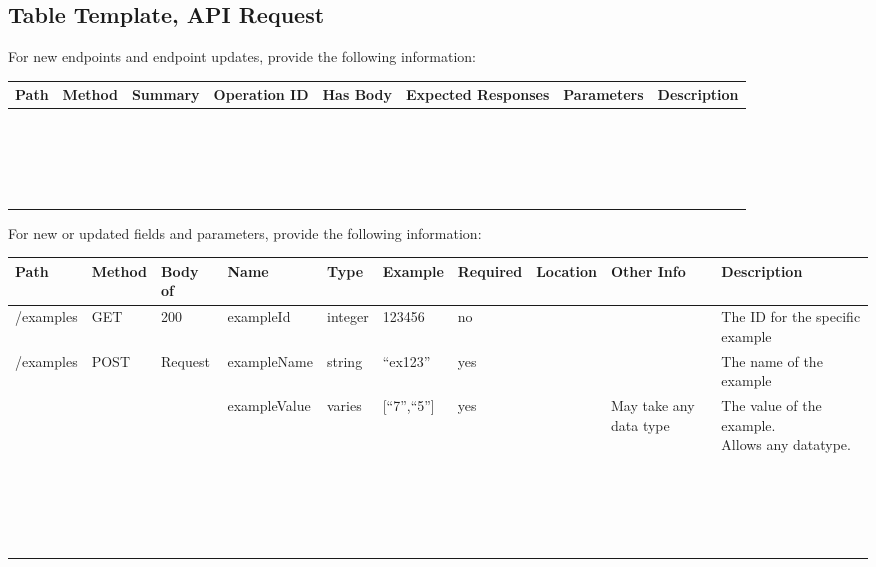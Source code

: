 \documentclass[a4paper]{article}
\begin{document}
\clearpage
\begin{landscape}
\subsection*{Table Template, API Request}
For new endpoints and endpoint updates, provide the following information:
\begin{flushleft}
\begin{tabular}{|l|l|l|l|l|l|l|l|}
	\hline
	\textbf{Path} & \textbf{Method} & \textbf{Summary} & \textbf{Operation ID} & \textbf{Has Body} & \textbf{Expected Responses} & \textbf{Parameters} & \textbf{Description}\\\hline
	~ & ~ & ~ & ~ & ~ & ~ & ~ & ~ \\\hline
	~ & ~ & ~ & ~ & ~ & ~ & ~ & ~ \\\hline
	~ & ~ & ~ & ~ & ~ & ~ & ~ & ~ \\\hline
	~ & ~ & ~ & ~ & ~ & ~ & ~ & ~ \\\hline
\end{tabular}
\end{flushleft}

For new or updated fields and parameters, provide the following information:

\begin{flushleft}
\begin{tabular}{|l|l|l|l|l|l|l|l|l|l|}
	\hline
	\textbf{Path} & \textbf{Method} & \textbf{Body of} & \textbf{Name} & \textbf{Type} & \textbf{Example} & \textbf{Required} & \textbf{Location} & \textbf{Other Info} & \textbf{Description}\\\hline
	/examples & GET & 200 & exampleId & integer & 123456 & no & ~ & ~ & The ID for the specific example\\\hline
	/examples & POST & Request & exampleName & string & {}``ex123'' & yes & ~ & ~ & The name of the example\\\hline
	~ & ~ & ~ & exampleValue & varies & [``7'',``5''] & yes & ~ & May take any data type & \makecell{The value of the example.\\ Allows any datatype.}\\\hline
	~ & ~ & ~ & ~ & ~ & ~ & ~ & ~ & ~ & ~ \\\hline
	~ & ~ & ~ & ~ & ~ & ~ & ~ & ~ & ~ & ~ \\\hline
	~ & ~ & ~ & ~ & ~ & ~ & ~ & ~ & ~ & ~ \\\hline
	~ & ~ & ~ & ~ & ~ & ~ & ~ & ~ & ~ & ~ \\\hline
\end{tabular}
\end{flushleft}
\end{landscape}
\end{document}
